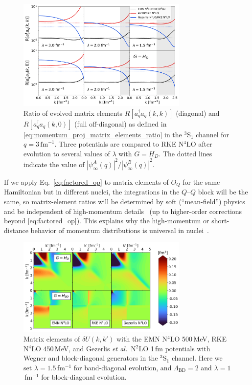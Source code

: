 \documentclass[10pt,aps,prc,floatfix,twocolumn,nofootinbib]{revtex4-1}
\newcommand{\LambdaBD}{{\Lambda_{\text{BD}}}}
\newcommand{\ataq}{a^{\dagger}_q a_q}
\newcommand{\QQ}{\ensuremath{Q\mbox{--}Q}}
\begin{document}
%
\begin{figure}[tbh]
	\includegraphics[clip,width=0.75\textwidth]{momentum_projection_ratios_q3p00_3S1_Wegner_kvnns_111_79_6_222.pdf}%
	\caption{Ratio of evolved matrix elements $R[\ataq(k,k)]$ (diagonal) and $R[\ataq(k,0)]$ (full off-diagonal) as defined in \eqref{eq:momentum_proj_matrix_elements_ratio} in the $^3$S$_1$ channel for $q = 3\,\mbox{fm}^{-1}$.
	Three potentials are compared to RKE N$^4$LO after evolution to several values of $\lambda$ with $G = H_D$.
	The dotted lines indicate the value of $|\psi^A_{\infty}(q)|^2 / |\psi^B_{\infty}(q)|^2$.}
	\label{fig:R_ratio_comparison}
\end{figure}
%

If we apply Eq.~\eqref{eq:factored_op} to matrix elements of $O_Q$ for the same Hamiltonian but in different nuclei, the integrations in the $\QQ$ block will be the same, so matrix-element ratios will be determined by soft (``mean-field'') physics and be independent of high-momentum details~\cite{Anderson:2010aq} (up to higher-order corrections beyond \eqref{eq:factored_op}). 
This explains why the high-momentum or short-distance behavior of momentum distributions is universal in nuclei~\cite{Anderson:2010aq,Bogner:2012zm,Neff:2015xda,Cruz-Torres:2019fum}.


%
\begin{figure}[tbh]
	\includegraphics[clip,width=0.75\textwidth]{unitary_transformation_contours_kvnns_79_111_222_lamb1p5_Lamb2p0.png}%
	\caption{Matrix elements of $\delta U(k,k')$ with the EMN N$^4$LO 500\,MeV, RKE N$^4$LO 450\,MeV, and Gezerlis \textit{et al.}~N$^2$LO 1\,fm potentials with Wegner and block-diagonal generators in the $^3$S$_1$ channel. Here we set $\lambda=1.5$\,fm$^{-1}$ for band-diagonal evolution, and $\LambdaBD=2$ and $\lambda=1$\,fm$^{-1}$ for block-diagonal evolution.}
	\label{fig:delta_U_default_potentials}
\end{figure}
\end{document}
